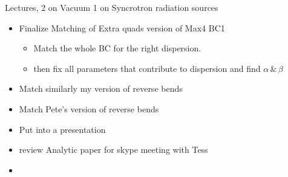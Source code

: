 


Lectures, 2 on Vacuum 1 on Syncrotron radiation sources



\begin{itemize}
    \item Finalize Matching of Extra quads version of Max4 BC1
    \begin{itemize}
        \item Match the whole BC for the right dispersion.
        \item then fix all parameters that contribute to dispersion and find $\alpha\, \&\, \beta$
    \end{itemize}
    \item Match similarly my version of reverse bends
    \item Match Pete's version of reverse bends
    \item Put into a presentation
    \item review Analytic paper for skype meeting with Tess
    \item 
\end{itemize}